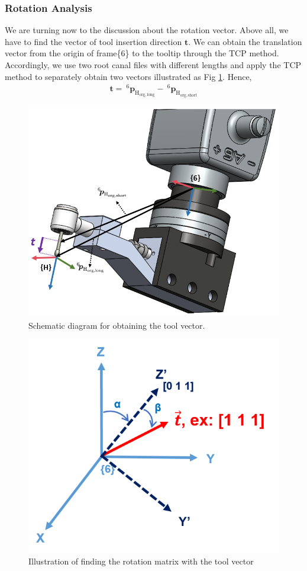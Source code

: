 \subsubsection{Rotation Analysis}
\label{sec:rot inf}
\hspace*{6mm}We are turning now to the discussion about the rotation vector. Above all, we have to find the vector of tool insertion direction $\boldsymbol{t}$. We can obtain the translation vector from the origin of frame\{6\} to the tooltip through the TCP method. Accordingly, we use two root canal files with different lengths and apply the TCP method to separately obtain two vectors illustrated as Fig \ref{fig:tcp2}. Hence, 
\begin{equation}
\begin{split}
\boldsymbol{t} =\ ^\mathrm{6}\!\boldsymbol{p}_\mathrm{H_{org,long}} -\ ^\mathrm{6}\!\boldsymbol{p}_\mathrm{H_{org,short}}
\end{split}
\end{equation}
\begin{figure}[htbp]
\begin{center}
\includegraphics[width=0.7\linewidth]{Images/TCP2.png}
\caption{ 
Schematic diagram for obtaining the tool vector. 
}\label{fig:tcp2}
\end{center}
\end{figure}
\begin{figure}[htbp]
\begin{center}
\includegraphics[width=0.6\linewidth]{Images/rot_inf.png}
\caption{
Illustration of finding the rotation matrix with the tool vector
}\label{fig:rot_inf}
\end{center}
\end{figure} 
